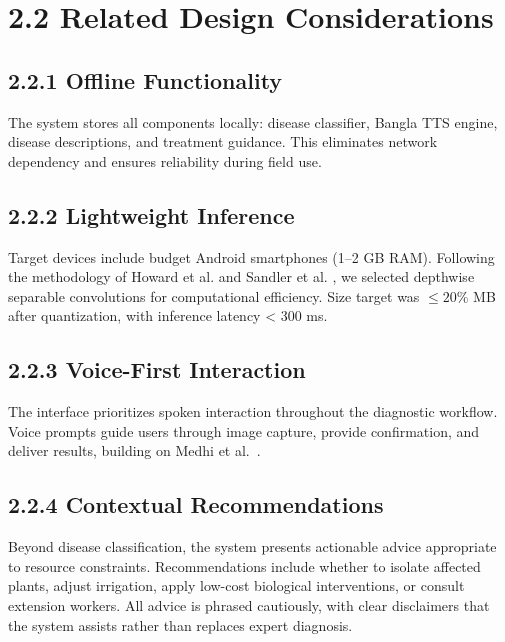 \documentclass[12pt,letterpaper]{report}
\begin{document}
\section*{2.2 Related Design Considerations}

\subsection*{2.2.1 Offline Functionality}
The system stores all components locally: disease classifier, Bangla TTS engine, disease descriptions, and treatment guidance. This eliminates network dependency and ensures reliability during field use.

\subsection*{2.2.2 Lightweight Inference}
Target devices include budget Android smartphones (1–2 GB RAM). Following the methodology of Howard et al. \cite{ref1} and Sandler et al. \cite{ref2}, we selected depthwise separable convolutions for computational efficiency. Size target was $\leq 20\%$ MB after quantization, with inference latency < 300 ms.

\subsection*{2.2.3 Voice-First Interaction}
The interface prioritizes spoken interaction throughout the diagnostic workflow. Voice prompts guide users through image capture, provide confirmation, and deliver results, building on Medhi et al.\ \cite{ref7}.

\subsection*{2.2.4 Contextual Recommendations}
Beyond disease classification, the system presents actionable advice appropriate to resource constraints. Recommendations include whether to isolate affected plants, adjust irrigation, apply low-cost biological interventions, or consult extension workers. All advice is phrased cautiously, with clear disclaimers that the system assists rather than replaces expert diagnosis.
\end{document}
